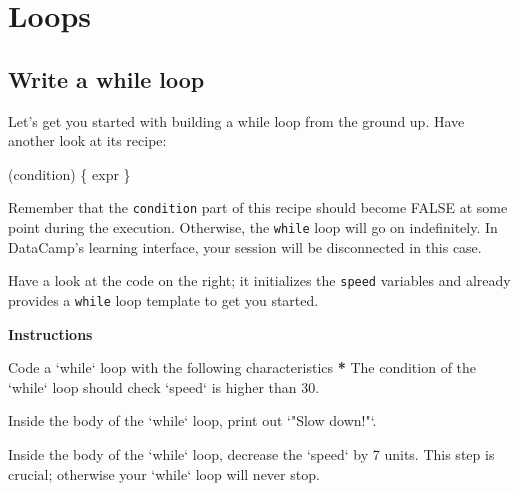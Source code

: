 \documentclass[]{article}
\newcommand{\hlnum}[1]{\textcolor[rgb]{0.816,0.125,0.439}{#1}}%
\newcommand{\hlstr}[1]{\textcolor[rgb]{0.251,0.627,0.251}{#1}}%
\newcommand{\hlstd}[1]{\textcolor[rgb]{0.251,0.251,0.251}{#1}}%
\newcommand{\hlkwc}[1]{\textcolor[rgb]{0.251,0.251,0.251}{#1}}%
\newenvironment{Shaded}{\begin{myshaded}}{\end{myshaded}}
\newcommand{\DataTypeTok}[1]{\hlkwc{#1}}
\newcommand{\DecValTok}[1]{\hlnum{#1}}
\newcommand{\StringTok}[1]{\hlstr{#1}}
\newcommand{\ErrorTok}[1]{\textbf{{#1}}}
\newcommand{\NormalTok}[1]{\hlstd{#1}}
\begin{document}
\section{Loops}\label{loops}

\subsection{Write a while loop}\label{write-a-while-loop}

Let's get you started with building a while loop from the ground up.
Have another look at its recipe:

\begin{Shaded}
\begin{Highlighting}[]
\NormalTok{ (condition) \{}
\NormalTok{expr}
\NormalTok{\}}
\end{Highlighting}
\end{Shaded}

Remember that the \texttt{condition} part of this recipe should become
FALSE at some point during the execution. Otherwise, the \texttt{while}
loop will go on indefinitely. In DataCamp's learning interface, your
session will be disconnected in this case.

Have a look at the code on the right; it initializes the \texttt{speed}
variables and already provides a \texttt{while} loop template to get you
started.

\textbf{Instructions}

\begin{Shaded}
\begin{Highlighting}[]
\NormalTok{Code a }\StringTok{`}\DataTypeTok{while}\StringTok{`}\NormalTok{ loop with the following characteristics}\OperatorTok{:}
\StringTok{  }
\StringTok{  }\ErrorTok{*}\StringTok{ }\NormalTok{The condition of the }\StringTok{`}\DataTypeTok{while}\StringTok{`}\NormalTok{ loop should check } \StringTok{`}\DataTypeTok{speed}\StringTok{`}\NormalTok{ is higher than }\DecValTok{30}\NormalTok{.}

\OperatorTok{*}\StringTok{ }\NormalTok{Inside the body of the }\StringTok{`}\DataTypeTok{while}\StringTok{`}\NormalTok{ loop, print out }\StringTok{`}\DataTypeTok{"Slow down!"}\StringTok{`}\NormalTok{.}

\OperatorTok{*}\StringTok{ }\NormalTok{Inside the body of the }\StringTok{`}\DataTypeTok{while}\StringTok{`}\NormalTok{ loop, decrease the }\StringTok{`}\DataTypeTok{speed}\StringTok{`}\NormalTok{ by }\DecValTok{7}\NormalTok{ units. This step is crucial; otherwise your }\StringTok{`}\DataTypeTok{while}\StringTok{`}\NormalTok{ loop will never stop.}
\end{Highlighting}
\end{Shaded}
\end{document}
